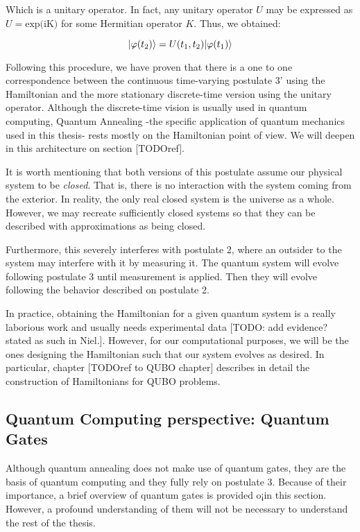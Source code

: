 Which is a unitary operator. In fact, any unitary operator $U$ may be expressed as $U = \text{exp(iK)}$ for some Hermitian operator $K$. Thus, we obtained: 

$$ |\varphi(t_2)\rangle = U(t_1, t_2) |\varphi(t_1)\rangle $$

Following this procedure, we have proven that there is a one to one correspondence between the continuous time-varying postulate 3' using the Hamiltonian and the more stationary discrete-time version using the unitary operator. Although the discrete-time vision is usually used in quantum computing, Quantum Annealing -the specific application of quantum mechanics used in this thesis- rests mostly on the Hamiltonian point of view. We will deepen in this architecture on section [TODOref].

It is worth mentioning that both versions of this postulate assume our physical system to be \emph{closed}. That is, there is no interaction with the system coming from the exterior. In reality, the only real closed system is the universe as a whole. However, we may recreate sufficiently closed systems so that they can be described with approximations as being closed. 

Furthermore, this severely interferes with postulate 2, where an outsider to the system may interfere with it by measuring it. The quantum system will evolve following postulate 3 until measurement is applied. Then they will evolve following the behavior described on postulate 2.

In practice, obtaining the Hamiltonian for a given quantum system is a really laborious work and usually needs experimental data [TODO: add evidence? stated as such in Niel.]. However, for our computational purposes, we will be the ones designing the Hamiltonian such that our system evolves as desired. In particular, chapter [TODOref to QUBO chapter] describes in detail the construction of Hamiltonians for QUBO problems.

\subsection{Quantum Computing perspective: Quantum Gates}

Although quantum annealing does not make use of quantum gates, they are the basis of quantum computing and they fully rely on postulate 3. Because of their importance, a brief overview of quantum gates is provided o¡in this section. However, a profound understanding of them will not be necessary to understand the rest of the thesis.

